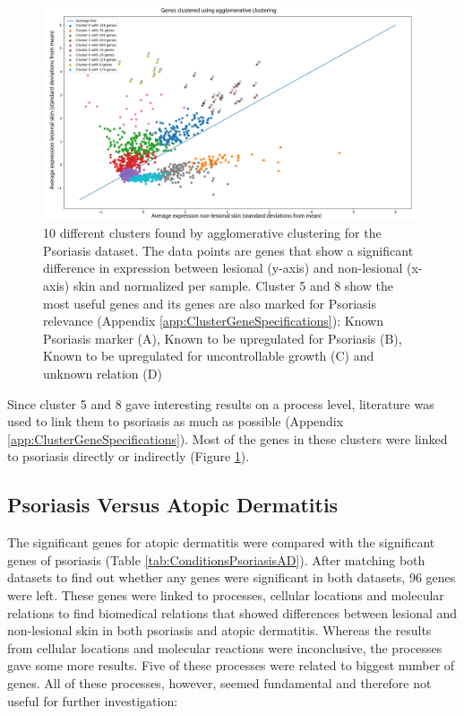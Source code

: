 \documentclass[10pt,a4paper]{report}
\begin{document}
	\begin{figure}[H]
		\includegraphics[width=\textwidth]{Cluster_Results.png}
		
		\caption{10 different clusters found by agglomerative clustering for the Psoriasis dataset. The data points are genes that show a significant difference in expression between lesional (y-axis) and non-lesional (x-axis) skin and normalized per sample. Cluster 5 and 8 show the most useful genes and its genes are also marked for Psoriasis relevance (Appendix \ref{app:ClusterGeneSpecifications}): Known Psoriasis marker (A), Known to be upregulated for Psoriasis (B), Known to be upregulated for uncontrollable growth (C) and unknown relation (D)}
		\label{fig:ClusteredGenes}
	\end{figure}
	
	Since cluster 5 and 8 gave interesting results on a process level, literature was used to link them to psoriasis as much as possible (Appendix \ref{app:ClusterGeneSpecifications}). Most of the genes in these clusters were linked to psoriasis directly or indirectly (Figure \ref{fig:ClusteredGenes}).
	
	\subsection{Psoriasis Versus Atopic Dermatitis}
	\label{subsec:ResultsPsoriasisVersusAtopicDermatitis}
	
	The significant genes for atopic dermatitis were compared with the significant genes of psoriasis (Table \ref{tab:ConditionsPsoriasisAD}). After matching both datasets to find out whether any genes were significant in both datasets, 96 genes were left. These genes were linked to processes, cellular locations and molecular relations to find biomedical relations that showed differences between lesional and non-lesional skin in both psoriasis and atopic dermatitis. Whereas the results from cellular locations and molecular reactions were inconclusive, the processes gave some more results. Five of these processes were related to biggest number of genes. All of these processes, however, seemed fundamental and therefore not useful for further investigation:
	
\end{document}
